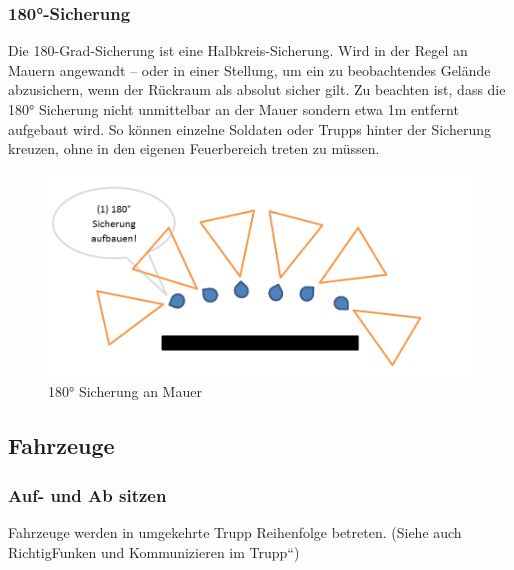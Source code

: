 \subsubsection{180°-Sicherung}
	Die 180-Grad-Sicherung ist eine Halbkreis-Sicherung. Wird in der Regel an Mauern angewandt – oder in einer Stellung, um ein zu beobachtendes Gelände abzusichern, wenn der Rückraum als absolut sicher gilt. Zu beachten ist, dass die 180° Sicherung nicht unmittelbar an der Mauer sondern etwa 1m entfernt aufgebaut wird. So können einzelne Soldaten oder Trupps hinter der Sicherung kreuzen, ohne in den eigenen Feuerbereich treten zu müssen. \\
		\begin{figure}[htbp]
			\centering
			\includegraphics[width=15cm]{./Grafiken/Abschnitt/180er.png}
			\caption{180° Sicherung an Mauer}
		\end{figure}

\subsection{Fahrzeuge}

\subsubsection{Auf- und Ab sitzen}

Fahrzeuge werden in umgekehrte Trupp Reihenfolge betreten. (Siehe auch \glqq Richtig\grqq Funken und Kommunizieren im Trupp“) \\

